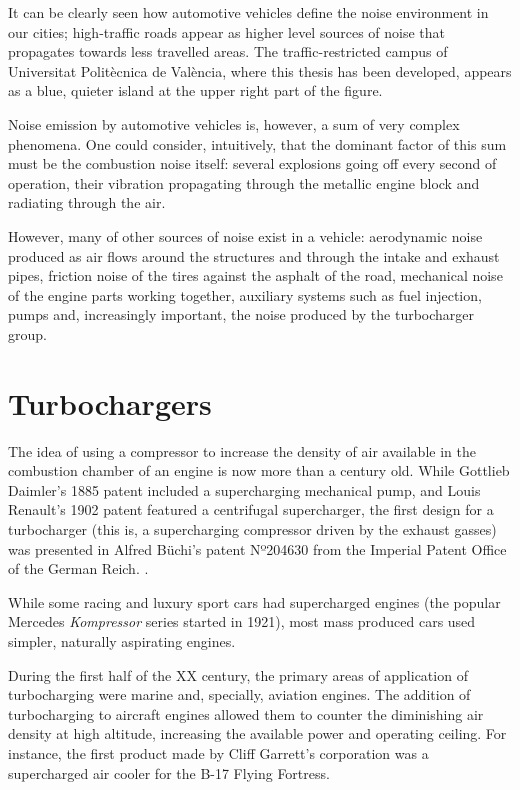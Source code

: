 It can be clearly seen how automotive vehicles define the noise environment in our cities; high-traffic roads appear as higher level sources of noise that propagates towards less travelled areas. The traffic-restricted campus of Universitat Politècnica de València, where this thesis has been developed, appears as a blue, quieter island at the upper right part of the figure.

Noise emission by automotive vehicles is, however, a sum of very complex phenomena. One could consider, intuitively, that the dominant factor of this sum must be the combustion noise itself: several explosions going off every second of operation, their vibration propagating through the metallic engine block and radiating through the air.

However, many of other sources of noise exist in a vehicle: aerodynamic noise produced as air flows around the structures and through the intake and exhaust pipes, friction noise of the tires against the asphalt of the road, mechanical noise of the engine parts working together, auxiliary systems such as fuel injection, pumps and, increasingly important, the noise produced by the turbocharger group.

\section{Turbochargers}

The idea of using a compressor to increase the density of air available in the combustion chamber of an engine is now more than a century old. While Gottlieb Daimler's 1885 patent included a supercharging mechanical pump, and Louis Renault's 1902 patent featured a centrifugal supercharger, the first design for a turbocharger (this is, a supercharging compressor driven by the exhaust gasses) was presented in Alfred Büchi's patent Nº204630 from the Imperial Patent Office of the German Reich. \cite{buchi1905patent}.

While some racing and luxury sport cars had supercharged engines (the popular Mercedes \emph{Kompressor} series started in 1921), most mass produced cars used simpler, naturally aspirating engines.

During the first half of the XX century, the primary areas of application of turbocharging were marine and, specially, aviation engines. The addition of turbocharging to aircraft engines allowed them to counter the diminishing air density at high altitude, increasing the available power and operating ceiling. For instance, the first product made by Cliff Garrett's corporation was a supercharged air cooler for the B-17 Flying Fortress.

